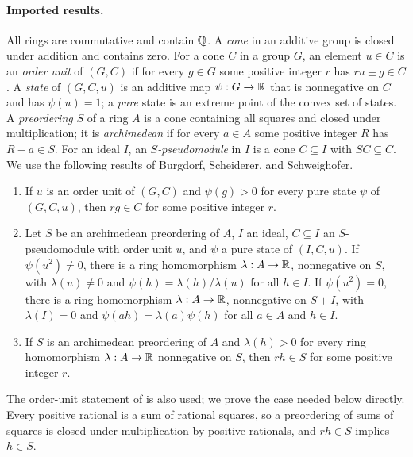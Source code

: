 \paragraph{Imported results.}
All rings are commutative and contain $\mathbb Q$. A \emph{cone} in an additive group
is closed under addition and contains zero. For a cone $C$ in a group $G$, an
element $u\in C$ is an \emph{order unit} of $(G,C)$ if for every $g\in G$ some
positive integer $r$ has $ru\pm g\in C$. A \emph{state} of $(G,C,u)$ is an
additive map $\psi:G\to\mathbb R$ that is nonnegative on $C$ and has $\psi(u)=1$; a
\emph{pure} state is an extreme point of the convex set of states. A
\emph{preordering} $S$ of a ring $A$ is a cone containing all squares and
closed under multiplication; it is \emph{archimedean} if for every $a\in A$
some positive integer $R$ has $R-a\in S$. For an ideal $I$, an
\emph{$S$-pseudomodule} in $I$ is a cone $C\subseteq I$ with $SC\subseteq C$.
We use the following results of Burgdorf, Scheiderer, and Schweighofer.
\begin{enumerate}[label=(\Roman*)]
\item \cite[Theorem~2.5]{BurgdorfScheidererSchweighofer2012} If $u$ is an
  order unit of $(G,C)$ and $\psi(g)>0$ for every pure state $\psi$ of
  $(G,C,u)$, then $rg\in C$ for some positive integer $r$.
\item \cite[Corollary~4.12]{BurgdorfScheidererSchweighofer2012} Let $S$ be an
  archimedean preordering of $A$, $I$ an ideal, $C\subseteq I$ an
  $S$-pseudomodule with order unit $u$, and $\psi$ a pure state of
  $(I,C,u)$. If $\psi(u^2)\ne0$, there is a ring homomorphism
  $\lambda:A\to\mathbb R$, nonnegative on $S$, with $\lambda(u)\ne0$ and
  $\psi(h)=\lambda(h)/\lambda(u)$ for all $h\in I$. If $\psi(u^2)=0$, there
  is a ring homomorphism $\lambda:A\to\mathbb R$, nonnegative on $S+I$, with
  $\lambda(I)=0$ and $\psi(ah)=\lambda(a)\psi(h)$ for all $a\in A$ and
  $h\in I$.
\item \cite[Theorem~6.2]{BurgdorfScheidererSchweighofer2012} If $S$ is an
  archimedean preordering of $A$ and $\lambda(h)>0$ for every ring
  homomorphism $\lambda:A\to\mathbb R$ nonnegative on $S$, then $rh\in S$ for some
  positive integer $r$.
\end{enumerate}
The order-unit statement of
\cite[Proposition~5.3(a) and Remark~5.5(1)]{BurgdorfScheidererSchweighofer2012}
is also used; we prove the case needed below directly. Every positive
rational is a sum of rational squares, so a preordering of sums of squares is
closed under multiplication by positive rationals, and $rh\in S$ implies
$h\in S$.

